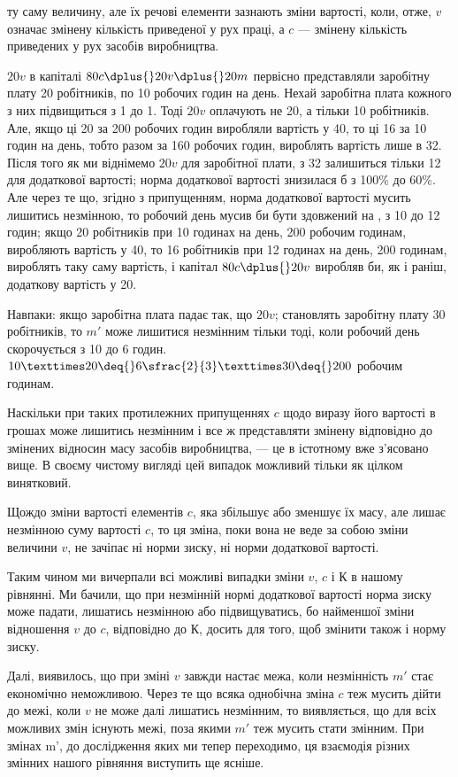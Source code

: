 \parcont{}  %
ту саму величину, але їх речові елементи зазнають зміни вартості,
коли, отже, $v$ означає змінену кількість приведеної у рух
праці, а $c$ — змінену кількість приведених у рух засобів виробництва.

$20v$ в капіталі $80c \dplus{} 20v \dplus{} 20m$ первісно представляли заробітну
плату 20 робітників, по 10 робочих годин на день. Нехай
заробітна плата кожного з них підвищиться з 1 до 1. Тоді $20v$
оплачують не 20, а тільки 10 робітників. Але, якщо ці 20 за
200 робочих годин виробляли вартість у 40, то ці 16 за 10 годин
на день, тобто разом за 160 робочих годин, вироблять вартість
лише в 32. Після того як ми віднімемо $20v$ для заробітної
плати, з 32 залишиться тільки 12 для додаткової вартості; норма
додаткової вартості знизилася б з 100\% до 60\%. Але через
те що, згідно з припущенням, норма додаткової вартості мусить
лишитись незмінною, то робочий день мусив би бути здовжений
на , з 10 до 12 годин; якщо 20 робітників при 10 годинах
на день, \deq{} 200 робочим годинам, виробляють вартість у 40, то
16 робітників при 12 годинах на день, \deq{} 200 годинам, вироблять
таку саму вартість, і капітал $80c \dplus{} 20v$ виробляв би, як і раніш,
додаткову вартість у 20.

Навпаки: якщо заробітна плата падає так, що $20v$; становлять
заробітну плату 30 робітників, то $m'$ може лишитися
незмінним тільки тоді, коли робочий день скорочується з 10
до 6 годин. $10 × 20 \deq{} 6\sfrac{2}{3} × 30 \deq{} 200$ робочим годинам.

Наскільки при таких протилежних припущеннях $c$ щодо виразу
його вартості в грошах може лишитись незмінним і все ж
представляти змінену відповідно до змінених відносин масу
засобів виробництва, — це в істотному вже з’ясовано вище.
В своєму чистому вигляді цей випадок можливий тільки як цілком
винятковий.

Щождо зміни вартості елементів $c$, яка збільшує або зменшує
їх масу, але лишає незмінною суму вартості $c$, то ця зміна, поки
вона не веде за собою зміни величини $v$, не зачіпає ні норми
зиску, ні норми додаткової вартості.

Таким чином ми вичерпали всі можливі випадки зміни $v$, $c$
і $К$ в нашому рівнянні. Ми бачили, що при незмінній нормі додаткової
вартості норма зиску може падати, лишатись незмінною
або підвищуватись, бо найменшої зміни відношення $v$ до $c$,
відповідно до $К$, досить для того, щоб змінити також і норму
зиску.

Далі, виявилось, що при зміні $v$ завжди настає межа, коли незмінність
$m'$ стає економічно неможливою. Через те що всяка
однобічна зміна $c$ теж мусить дійти до межі, коли $v$ не може
далі лишатись незмінним, то виявляється, що для всіх можливих
змін  існують межі, поза якими $m'$ теж мусить стати змінним.
При змінах m', до дослідження яких ми тепер переходимо, ця
взаємодія різних змінних нашого рівняння виступить ще ясніше.
